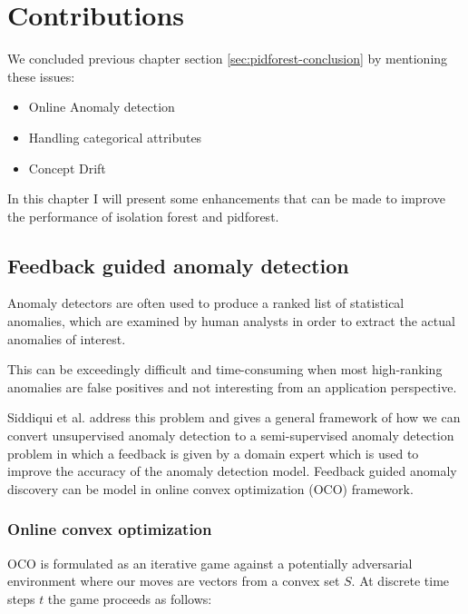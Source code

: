 \chapter{Contributions}
\label{ch:contributions}

We concluded previous chapter section \ref{sec:pidforest-conclusion} by mentioning these issues:
\vspace{-0.5em}
\begin{itemize}
    \setlength\itemsep{-0.5em}
    \item Online Anomaly detection
    \item Handling categorical attributes
    \item Concept Drift
\end{itemize}

In this chapter I will present some enhancements that can be made to improve the performance of isolation forest and pidforest.


\section{Feedback guided anomaly detection}
\label{sec:feedback-guided-anomaly-detection}

Anomaly detectors are often used to produce a ranked list of statistical anomalies, which are examined by human analysts in order to extract the actual anomalies of interest. 

This can be exceedingly difficult and time-consuming when most high-ranking anomalies are false positives and not interesting from an application perspective.

Siddiqui et al. \cite{10.1145/3219819.3220083} address this problem and gives a general framework of how we can convert unsupervised anomaly detection to a semi-supervised anomaly detection problem in which a feedback is given by a domain expert which is used to improve the accuracy of the anomaly detection model. 
Feedback guided anomaly discovery can be model in online convex optimization (OCO) framework. 


\subsection{Online convex optimization}
\label{subsec:online-convex-optimization}

OCO is formulated as an iterative game against a potentially adversarial environment where our moves are vectors from a convex set $S$.
At discrete time steps $t$ the game proceeds as follows:

